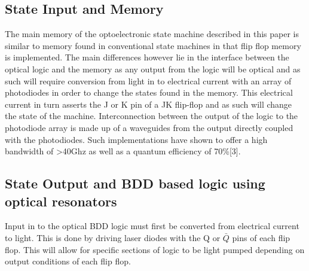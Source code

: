 \documentclass[letterpaper, 10 pt, conference]{ieeeconf}  %
\begin{document}
\subsection{State Input and Memory}

The main memory of the optoelectronic state machine described in this paper is similar to memory found in conventional state machines in that flip flop memory is implemented. The main differences however lie in the interface between the optical logic and the memory as any output from the logic will be optical and as such will require conversion from light in to electrical current with an array of photodiodes in order to change the states found in the memory. This electrical current in turn asserts the J or K pin of a JK flip-flop and as such will change the state of the machine. Interconnection between the output of the logic to the photodiode array is made up of a waveguides from the output directly coupled with the photodiodes. Such implementations have shown to offer a high bandwidth of >40Ghz as well as a quantum efficiency of 70\%[3]. 


\subsection{State Output and BDD based logic using optical resonators}

Input in to the optical BDD logic must first be converted from electrical current to light. This is done by driving laser diodes with the Q or $\bar{Q}$ pins of each flip flop. This will allow for specific sections of logic to be light pumped depending on output conditions of each flip flop. 
\end{document}

